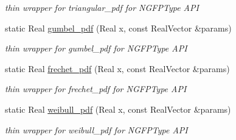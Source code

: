 \begin{DoxyCompactItemize}
\begin{DoxyCompactList}\small\item\em thin wrapper for triangular\+\_\+pdf for N\+G\+F\+P\+Type A\+PI \end{DoxyCompactList}\item 
static Real \hyperlink{classPecos_1_1NumericGenOrthogPolynomial_a5644545bfb9382ef39793c479c47752a}{gumbel\+\_\+pdf} (Real x, const Real\+Vector \&params)\label{classPecos_1_1NumericGenOrthogPolynomial_a5644545bfb9382ef39793c479c47752a}

\begin{DoxyCompactList}\small\item\em thin wrapper for gumbel\+\_\+pdf for N\+G\+F\+P\+Type A\+PI \end{DoxyCompactList}\item 
static Real \hyperlink{classPecos_1_1NumericGenOrthogPolynomial_ad301cf09c365c9ca22fa42bee5e62a3a}{frechet\+\_\+pdf} (Real x, const Real\+Vector \&params)\label{classPecos_1_1NumericGenOrthogPolynomial_ad301cf09c365c9ca22fa42bee5e62a3a}

\begin{DoxyCompactList}\small\item\em thin wrapper for frechet\+\_\+pdf for N\+G\+F\+P\+Type A\+PI \end{DoxyCompactList}\item 
static Real \hyperlink{classPecos_1_1NumericGenOrthogPolynomial_a152a1b46c48783d167773e4a6c468bdb}{weibull\+\_\+pdf} (Real x, const Real\+Vector \&params)\label{classPecos_1_1NumericGenOrthogPolynomial_a152a1b46c48783d167773e4a6c468bdb}

\begin{DoxyCompactList}\small\item\em thin wrapper for weibull\+\_\+pdf for N\+G\+F\+P\+Type A\+PI \end{DoxyCompactList}\end{DoxyCompactItemize}
